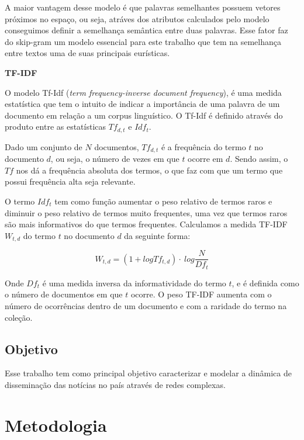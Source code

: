 \documentclass[a4paper,12pt]{article}
\begin{document}
\begin{description}
  A maior vantagem desse modelo é que palavras semelhantes possuem vetores próximos no espaço, ou seja, atráves dos atributos calculados pelo
  modelo conseguimos definir a semelhança semântica entre duas palavras. Esse fator faz do skip-gram um modelo essencial para este trabalho
  que tem na semelhança entre textos uma de suas principais eurísticas.
  
 \item \textbf{TF-IDF}
 
  O modelo Tf-Idf (\textit{term frequency-inverse document frequency}), é uma medida estatística que tem o intuito de indicar
  a importância de uma palavra de um documento em relação a um corpus linguístico. O Tf-Idf é definido através do produto entre as 
  estatísticas $Tf_{d,t}$ e $Idf_{t}$.

  Dado um conjunto de $N$ documentos, $Tf_{d,t}$ é a frequência do termo $t$ no documento
  $d$, ou seja, o número de vezes em que $t$ ocorre em $d$. Sendo assim, o $Tf$ nos dá a frequência absoluta dos termos, 
  o que faz com que um termo que possui frequência alta seja relevante.
  
  O termo $Idf_{t}$ tem como função aumentar o peso relativo de termos raros e diminuir o peso relativo de termos muito frequentes,
  uma vez que termos raros são mais informativos do que termos frequentes. Calculamos a medida TF-IDF $ W_{t,d}$ do termo $t$ no documento
  $d$ da seguinte forma:

  $$ W_{t,d} = (1 + log Tf_{t,d}) \cdot \ log \dfrac{N}{Df_{t}}$$

  Onde $Df_{t}$ é uma medida inversa da informatividade do termo $t$, e é definida como o número de documentos em que $t$ ocorre. O peso
  TF-IDF aumenta com o número de ocorrências dentro de um documento e com a raridade do termo na coleção.
\end{description}

\subsection{Objetivo}

Esse trabalho tem como principal objetivo caracterizar e modelar a dinâmica de disseminação das notícias no país através de redes complexas.




\pagebreak
\section{Metodologia}
\end{document}

